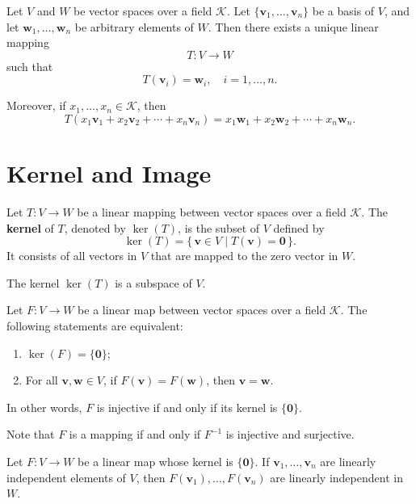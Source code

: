 \begin{theoremenv}
	Let $V$ and $W$ be vector spaces over a field $\mathcal{K}$.
	Let $\{\bm{v}_1, \dots, \bm{v}_n\}$ be a basis of $V$,
	and let $\bm{w}_1, \dots, \bm{w}_n$ be arbitrary elements of $W$.
	Then there exists a unique linear mapping
	\[
	T : V \to W
	\]
	such that
	\[
	T(\bm{v}_i) = \bm{w}_i, \quad i = 1, \dots, n.
	\]

	Moreover, if $x_1, \dots, x_n \in \mathcal{K}$, then
	\[
	T(x_1 \bm{v}_1 + x_2 \bm{v}_2 + \cdots + x_n \bm{v}_n) = x_1 \bm{w}_1 + x_2 \bm{w}_2 + \cdots + x_n \bm{w}_n.
	\]
\end{theoremenv}

\section{Kernel and Image}
\begin{definitionenv}
	Let $T : V \to W$ be a linear mapping between vector spaces over a field $\mathcal{K}$.
	The \textbf{kernel} of $T$, denoted by $\ker(T)$, is the subset of $V$ defined by
	\[
	\ker(T) = \{\, \bm{v} \in V \mid T(\bm{v}) = \bm{0} \,\}.
	\]
	It consists of all vectors in $V$ that are mapped to the zero vector in $W$.

\end{definitionenv}

\begin{remarkenv}
	The kernel $\ker(T)$ is a subspace of $V$.
\end{remarkenv}

\begin{theoremenv}
	Let $F : V \to W$ be a linear map between vector spaces over a field $\mathcal{K}$.
	The following statements are equivalent:
	\begin{enumerate}
		\item $\ker(F) = \{\bm{0}\}$;
		\item For all $\bm{v}, \bm{w} \in V$, if $F(\bm{v}) = F(\bm{w})$, then $\bm{v} = \bm{w}$.
	\end{enumerate}
	In other words, $F$ is injective if and only if its kernel is $\{\bm{0}\}$.
\end{theoremenv}

\begin{remarkenv}
	Note that $F$ is a mapping if and only if $F^{-1}$ is injective and surjective.
\end{remarkenv}

\begin{theoremenv}
	Let $F : V \to W$ be a linear map whose kernel is $\{\bm{0}\}$.
	If $\bm{v}_1, \dots, \bm{v}_n$ are linearly independent elements of $V$,
	then $F(\bm{v}_1), \dots, F(\bm{v}_n)$ are linearly independent in $W$.
\end{theoremenv}


